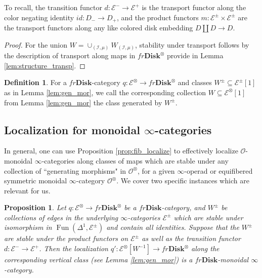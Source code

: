 \documentclass[reqno]{amsart}
\newtheorem{proposition}[lemma]{Proposition}
\theoremstyle{definition}
\newtheorem{definition}[lemma]{Definition}
\newcommand{\mcl}[1]{\mathcal{#1}}
\newcommand{\msc}[1]{\mathscr{#1}}
\newcommand{\ot}{\otimes}
\newcommand{\Disk}{\mathbf{Disk}}
\DeclareMathOperator{\Fun}{Fun}
\renewcommand{\1}{\mathbf{1}}
\begin{document}
To recall, the transition functor $d:\msc{E}^-\to \msc{E}^+$ is the transport functor along the color negating identity $id:D_-\to D_+$, and the product functors $m:\msc{E}^{\pm}\times \msc{E}^{\pm}$ are the transport functors along any like colored disk embedding $D\amalg D\to D$.

\begin{proof}
For the union $W=\cup_{(\mcl{I},\mu)}W_{(\mcl{I},\mu)}$, stability under transport follows by the description of transport along maps in $fr\Disk^{\ot}$ provide in Lemma \ref{lem:structure_transp}.
\end{proof}

\begin{definition}
For a $fr\Disk$-category $q:\msc{E}^{\ot}\to fr\Disk^{\ot}$ and classes $W^{\pm}\subseteq \msc{E}^{\pm}[1]$ as in Lemma \ref{lem:gen_mor}, we call the corresponding collection $W\subseteq \msc{E}^{\ot}[1]$ from Lemma \ref{lem:gen_mor} the class generated by $W^{\pm}$.
\end{definition}


\subsection{Localization for monoidal $\infty$-categories}

In general, one can use Proposition \ref{prop:fib_localize} to effectively localize $\msc{O}$-monoidal $\infty$-categories along classes of maps which are stable under any collection of ``generating morphisms" in $\msc{O}^{\ot}$, for a given $\infty$-operad or equifibered symmetric monoidal $\infty$-category $\msc{O}^{\ot}$.  We cover two specific instances which are relevant for us.

\begin{proposition}\label{prop:fr_loc}
Let $q:\msc{E}^{\ot}\to fr\Disk^{\ot}$ be a $fr\Disk$-category, and $W^{\pm}$ be collections of edges in the underlying $\infty$-categories $\msc{E}^{\pm}$ which are stable under isomorphism in $\Fun(\Delta^1,\msc{E}^{\pm})$ and contain all identities.  Suppose that the $W^{\pm}$ are stable under the product functors on $\msc{E}^{\pm}$ as well as the transition functor $d:\msc{E}^{-}\to \msc{E}^+$. Then the localization $q':\msc{E}^{\ot}[W^{-1}]\to fr\Disk^{\ot}$ along the corresponding vertical class (see Lemma \ref{lem:gen_mor}) is a $fr\Disk$-monoidal $\infty$-category.
\end{proposition}
\end{document}
